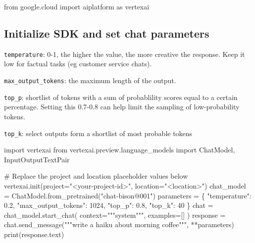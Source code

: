 \documentclass[
  letterpaper,
  DIV=11,
  numbers=noendperiod]{scrreprt}
\newenvironment{Shaded}{\begin{snugshade}}{\end{snugshade}}
\newcommand{\BuiltInTok}[1]{\textcolor[rgb]{0.00,0.23,0.31}{#1}}
\newcommand{\CommentTok}[1]{\textcolor[rgb]{0.37,0.37,0.37}{#1}}
\newcommand{\DecValTok}[1]{\textcolor[rgb]{0.68,0.00,0.00}{#1}}
\newcommand{\FloatTok}[1]{\textcolor[rgb]{0.68,0.00,0.00}{#1}}
\newcommand{\ImportTok}[1]{\textcolor[rgb]{0.00,0.46,0.62}{#1}}
\newcommand{\NormalTok}[1]{\textcolor[rgb]{0.00,0.23,0.31}{#1}}
\newcommand{\OperatorTok}[1]{\textcolor[rgb]{0.37,0.37,0.37}{#1}}
\newcommand{\StringTok}[1]{\textcolor[rgb]{0.13,0.47,0.30}{#1}}
\begin{document}
\begin{Shaded}
\begin{Highlighting}[]
\ImportTok{from}\NormalTok{ google.cloud }\ImportTok{import}\NormalTok{ aiplatform }\ImportTok{as}\NormalTok{ vertexai}
\end{Highlighting}
\end{Shaded}

\hypertarget{initialize-sdk-and-set-chat-parameters}{%
\subsection{Initialize SDK and set chat
parameters}\label{initialize-sdk-and-set-chat-parameters}}

\texttt{temperature}: 0-1, the higher the value, the more creative the
response. Keep it low for factual tasks (eg customer service chats).

\texttt{max\_output\_tokens}: the maximum length of the output.

\texttt{top\_p}: shortlist of tokens with a sum of probablility scores
equal to a certain percentage. Setting this 0.7-0.8 can help limit the
sampling of low-probability tokens.

\texttt{top\_k}: select outputs form a shortlist of most probable tokens

\begin{Shaded}
\begin{Highlighting}[]
\ImportTok{import}\NormalTok{ vertexai}
\ImportTok{from}\NormalTok{ vertexai.preview.language\_models }\ImportTok{import}\NormalTok{ ChatModel, InputOutputTextPair}

\CommentTok{\# Replace the project and location placeholder values below}
\NormalTok{vertexai.init(project}\OperatorTok{=}\StringTok{"\textless{}your{-}project{-}id\textgreater{}"}\NormalTok{, location}\OperatorTok{=}\StringTok{"\textless{}location\textgreater{}"}\NormalTok{)}
\NormalTok{chat\_model }\OperatorTok{=}\NormalTok{ ChatModel.from\_pretrained(}\StringTok{"chat{-}bison@001"}\NormalTok{)}
\NormalTok{parameters }\OperatorTok{=}\NormalTok{ \{}
    \StringTok{"temperature"}\NormalTok{: }\FloatTok{0.2}\NormalTok{,}
    \StringTok{"max\_output\_tokens"}\NormalTok{: }\DecValTok{1024}\NormalTok{,}
    \StringTok{"top\_p"}\NormalTok{: }\FloatTok{0.8}\NormalTok{,}
    \StringTok{"top\_k"}\NormalTok{: }\DecValTok{40}
\NormalTok{\}}
\NormalTok{chat }\OperatorTok{=}\NormalTok{ chat\_model.start\_chat(}
\NormalTok{    context}\OperatorTok{=}\StringTok{"""system"""}\NormalTok{,}
\NormalTok{    examples}\OperatorTok{=}\NormalTok{[]}
\NormalTok{)}
\NormalTok{response }\OperatorTok{=}\NormalTok{ chat.send\_message(}\StringTok{"""write a haiku about morning coffee"""}\NormalTok{, }\OperatorTok{**}\NormalTok{parameters)}
\BuiltInTok{print}\NormalTok{(response.text)}
\end{Highlighting}
\end{Shaded}
\end{document}
